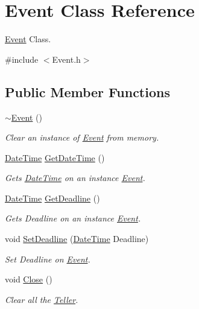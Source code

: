 \hypertarget{class_event}{\section{Event Class Reference}
\label{class_event}
}


\hyperlink{class_event}{Event} Class.  




{\ttfamily \#include $<$Event.\-h$>$}

\subsection*{Public Member Functions}
\begin{DoxyCompactItemize}
\item 
\hyperlink{class_event_a7704ec01ce91e673885792054214b3d2}{$\sim$\-Event} ()
\begin{DoxyCompactList}\small\item\em Clear an instance of \hyperlink{class_event}{Event} from memory. \end{DoxyCompactList}\item 
\hyperlink{class_date_time}{Date\-Time} \hyperlink{class_event_ab828b0511da4f76c3090c88d8c9bbe2c}{Get\-Date\-Time} ()
\begin{DoxyCompactList}\small\item\em Gets \hyperlink{class_date_time}{Date\-Time} on an instance \hyperlink{class_event}{Event}. \end{DoxyCompactList}\item 
\hyperlink{class_date_time}{Date\-Time} \hyperlink{class_event_aeaea78f235bea3fc083f1a070c7e821a}{Get\-Deadline} ()
\begin{DoxyCompactList}\small\item\em Gets Deadline on an instance \hyperlink{class_event}{Event}. \end{DoxyCompactList}\item 
void \hyperlink{class_event_a70a345abe7ed4136058524ffdf3d3d53}{Set\-Deadline} (\hyperlink{class_date_time}{Date\-Time} Deadline)
\begin{DoxyCompactList}\small\item\em Set Deadline on \hyperlink{class_event}{Event}. \end{DoxyCompactList}\item 
void \hyperlink{class_event_acc0755128d9534def434679355004e79}{Close} ()
\begin{DoxyCompactList}\small\item\em Clear all the \hyperlink{class_teller}{Teller}. \end{DoxyCompactList}\end{DoxyCompactItemize}
